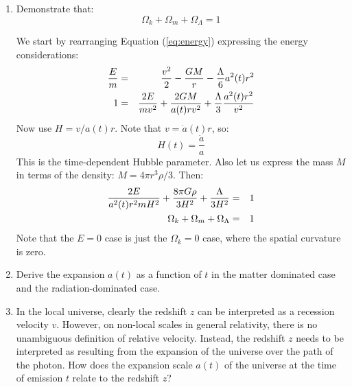 \begin{enumerate}
\item Demonstrate that:
\begin{equation}
\Omega_k + \Omega_m + \Omega_\Lambda = 1
\end{equation}
\begin{answer}
We start by rearranging Equation (\ref{eq:energy}) expressing the
energy considerations:
\begin{eqnarray}
\frac{E}{m} &=& \frac{v^2}{2}-\frac{GM}{r} - \frac{\Lambda}{6}a^2(t)r^2 \cr
1 &=& \frac{2E}{mv^2} + \frac{2GM}{a(t) rv^2} +
\frac{\Lambda}{3}\frac{a^2(t) r^2}{v^2} 
\end{eqnarray}
Now use $H=v/a(t)r$. Note that $v={\dot a}(t) r$, so:
\begin{equation}
H(t) = \frac{\dot a}{a}
\end{equation}
This is the time-dependent Hubble parameter. Also let us express the
mass $M$ in terms of the density: $M=4\pi r^3\rho/3$. Then:
\begin{eqnarray}
\frac{2E}{a^2(t) r^2 m H^2} + \frac{8\pi
  G\rho}{3H^2}+\frac{\Lambda}{3H^2} &=& 1 \cr 
\Omega_k + \Omega_m + \Omega_\Lambda &=& 1
\end{eqnarray}
Note that the $E=0$ case is just the $\Omega_k=0$ case, where the
spatial curvature is zero.
\end{answer}
\item Derive the expansion $a(t)$ as a function of $t$ in the matter
dominated case and the radiation-dominated case.
\item 
In the local universe, clearly the redshift $z$ can be interpreted as
a recession velocity $v$.  However, on non-local scales in general
relativity, there is no unambiguous definition of relative
velocity. Instead, the redshift $z$ needs to be interpreted as
resulting from the expansion of the universe over the path of the
photon.  How does the expansion scale $a(t)$ of the universe at the
time of emission $t$ relate to the redshift $z$?


\end{enumerate}
